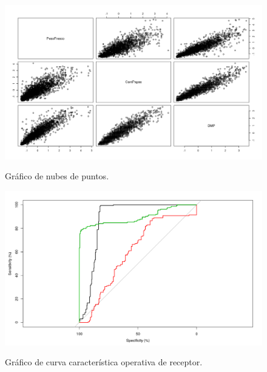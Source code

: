 \begin{figure}[h]
	\caption{Gráfico de nubes de puntos.}
	\centering
	\includegraphics[scale=0.5]{cloudpoints.png}
	\label{fig:cloudpoints}
\end{figure}

\begin{figure}[h]
	\caption{Gráfico de curva característica operativa de receptor.}
	\centering
	\includegraphics[scale=0.5]{roc.png}
	\label{fig:roc}
\end{figure}